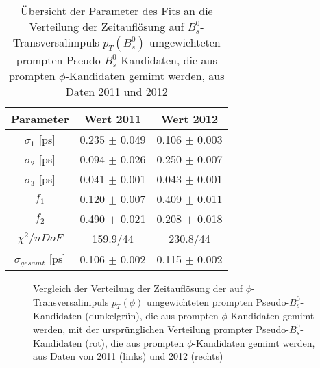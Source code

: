 \documentclass{article}
\begin{document}
\begin{table}[h!]
\noindent \begin{centering}
\begin{tabular}{c|c|c}
Parameter&Wert 2011&Wert 2012\tabularnewline
\hline 
$\sigma_1$ [ps] & 0.235 $\pm$ 0.049 & 0.106 $\pm$ 0.003 \tabularnewline
$\sigma_2$ [ps]& 0.094 $\pm$ 0.026  & 0.250 $\pm$ 0.007 \tabularnewline
$\sigma_3$ [ps]& 0.041 $\pm$ 0.001 & 0.043 $\pm$ 0.001 \tabularnewline%
$f_1$ & 0.120 $\pm$ 0.007 & 0.409 $\pm$ 0.011   \tabularnewline
$f_2$ & 0.490 $\pm$ 0.021 & 0.208 $\pm$ 0.018 \tabularnewline
\hline
$\chi^2/nDoF$ & 159.9/44 & 230.8/44\tabularnewline
\hline
$\sigma_{gesamt}$ [ps]&0.106 $\pm$ 0.002&0.115 $\pm$ 0.002 \tabularnewline
\end{tabular}
\par \end{centering}
\caption{Übersicht der Parameter des Fits an die Verteilung der Zeitauflösung auf $B_s^0$-Transversalimpuls $p_T(B_s^0)$ umgewichteten prompten Pseudo-$B_s^0$-Kandidaten, die aus prompten $\phi$-Kandidaten gemimt werden, aus Daten 2011 und 2012}
\label{table:fitpromptdatarebspt}
\end{table}

\begin{figure}[h!]
\caption{Vergleich der Verteilung der Zeitauflösung der auf $\phi$-Transversalimpuls $p_T(\phi)$ umgewichteten prompten Pseudo-$B_s^0$-Kandidaten (dunkelgrün), die aus prompten $\phi$-Kandidaten gemimt werden, mit der ursprünglichen Verteilung prompter Pseudo-$B_s^0$-Kandidaten (rot), die aus prompten $\phi$-Kandidaten gemimt werden, aus Daten von 2011 (links) und 2012 (rechts)}
\label{fig:tresphipt}
\end{figure} 
\end{document}
